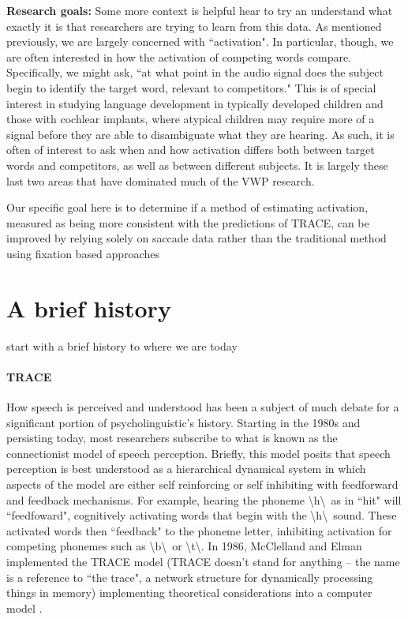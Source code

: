 \documentclass{article}
\begin{document}
\textbf{Research goals: } Some more context is helpful hear to try an understand what exactly it is that researchers are trying to learn from this data. As mentioned previously, we are largely concerned with ``activation". In particular, though, we are often interested in how the activation of competing words compare. Specifically, we might ask, ``at what point in the audio signal does the subject begin to identify the target word, relevant to competitors." This is of special interest in studying language development in typically developed children and those with cochlear implants, where atypical children may require more of a signal before they are able to disambiguate what they are hearing. As such, it is often of interest to ask when and how activation differs both between target words and competitors, as well as between different subjects. It is largely these last two areas that have dominated much of the VWP research.

Our specific goal here is to determine if a method of estimating activation, measured as being more consistent with the predictions of TRACE, can be improved by relying solely on saccade data rather than the traditional method using fixation based approaches


\section{A brief history}
start with a brief history to where we are today

\paragraph{TRACE } How speech is perceived and understood has been a subject of much debate for a significant portion of psycholinguistic's history. Starting in the 1980s and persisting today, most researchers subscribe to what is known as the connectionist model of speech perception. Briefly, this model posits that speech perception is best understood as a hierarchical dynamical system in which aspects of the model are either self reinforcing or self inhibiting with feedforward and feedback mechanisms. For example, hearing the phoneme \textbackslash h\textbackslash  \ as in ``hit" will ``feedfoward", cognitively activating words that begin with the \textbackslash h\textbackslash \  sound. These activated words then ``feedback" to the phoneme letter, inhibiting activation for competing phonemes such as \textbackslash b\textbackslash \ or \textbackslash t\textbackslash. In 1986, McClelland and Elman implemented the TRACE model (TRACE doesn't stand for anything -- the name is a reference to ``the trace", a network structure for dynamically processing things in memory) implementing theoretical considerations into a computer model \cite{elman1985speech}.
\end{document}
